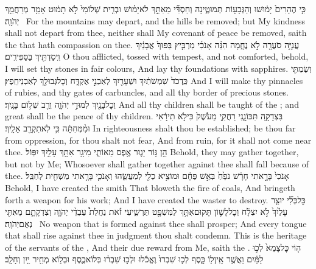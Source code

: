 {כִּ֤י הֶהָרִים֙ יָמ֔וּשׁוּ וְהַגְּבָע֖וֹת תְּמוּטֶ֑ינָה וְחַסְדִּ֞י מֵאִתֵּ֣ךְ לֹא\maqqaf יָמ֗וּשׁ וּבְרִ֤ית שְׁלוֹמִי֙ לֹ֣א תָמ֔וּט אָמַ֥ר מְרַחֲמֵ֖ךְ יְהֹוָֽה׃ \setuma }
{For the mountains may depart, and the hills be removed; but My kindness shall not depart from thee, neither shall My covenant of peace be removed, saith the \lord\space that hath compassion on thee.}
{עֲנִיָּ֥ה סֹעֲרָ֖ה לֹ֣א נֻחָ֑מָה הִנֵּ֨ה אָנֹכִ֜י מַרְבִּ֤יץ בַּפּוּךְ֙ אֲבָנַ֔יִךְ וִֽיסַדְתִּ֖יךְ בַּסַּפִּירִֽים׃}
{O thou afflicted, tossed with tempest, and not comforted, behold, I will set thy stones in fair colours, And lay thy foundations with sapphires.}
{וְשַׂמְתִּ֤י כַּֽדְכֹד֙ שִׁמְשֹׁתַ֔יִךְ וּשְׁעָרַ֖יִךְ לְאַבְנֵ֣י אֶקְדָּ֑ח וְכׇל\maqqaf גְּבוּלֵ֖ךְ לְאַבְנֵי\maqqaf חֵֽפֶץ׃}
{And I will make thy pinnacles of rubies, and thy gates of carbuncles, and all thy border of precious stones.}
{וְכׇל\maqqaf בָּנַ֖יִךְ לִמּוּדֵ֣י יְהֹוָ֑ה וְרַ֖ב שְׁל֥וֹם בָּנָֽיִךְ׃}
{And all thy children shall be taught of the \lord; and great shall be the peace of thy children.}
{בִּצְדָקָ֖ה תִּכּוֹנָ֑נִי רַחֲקִ֤י מֵעֹ֙שֶׁק֙ כִּי\maqqaf לֹ֣א תִירָ֔אִי וּמִ֨מְּחִתָּ֔ה כִּ֥י לֹֽא\maqqaf תִקְרַ֖ב אֵלָֽיִךְ׃}
{In righteousness shalt thou be established; be thou far from oppression, for thou shalt not fear, And from ruin, for it shall not come near thee.}
{הֵ֣ן גּ֥וֹר יָג֛וּר אֶ֖פֶס מֵאוֹתִ֑י מִי\maqqaf גָ֥ר אִתָּ֖ךְ עָלַ֥יִךְ יִפּֽוֹל׃}
{Behold, they may gather together, but not by Me; Whosoever shall gather together against thee shall fall because of thee.}
{ אָנֹכִי֙ בָּרָ֣אתִי חָרָ֔שׁ נֹפֵ֙חַ֙ בְּאֵ֣שׁ פֶּחָ֔ם וּמוֹצִ֥יא כְלִ֖י לְמַעֲשֵׂ֑הוּ וְאָנֹכִ֛י בָּרָ֥אתִי מַשְׁחִ֖ית לְחַבֵּֽל׃}
{Behold, I have created the smith That bloweth the fire of coals, And bringeth forth a weapon for his work; And I have created the waster to destroy.}
{כׇּל\maqqaf כְּלִ֞י יוּצַ֤ר עָלַ֙יִךְ֙ לֹ֣א יִצְלָ֔ח וְכׇל\maqqaf לָשׁ֛וֹן תָּקוּם\maqqaf אִתָּ֥ךְ לַמִּשְׁפָּ֖ט תַּרְשִׁ֑יעִי זֹ֡את נַחֲלַת֩ עַבְדֵ֨י יְהֹוָ֧ה וְצִדְקָתָ֛ם מֵאִתִּ֖י נְאֻם\maqqaf יְהֹוָֽה׃ \setuma }
{No weapon that is formed against thee shall prosper; And every tongue that shall rise against thee in judgment thou shalt condemn. This is the heritage of the servants of the \lord, And their due reward from Me, saith the \lord.}
\newperek
{}
{ה֤וֹי כׇּל\maqqaf צָמֵא֙ לְכ֣וּ לַמַּ֔יִם וַאֲשֶׁ֥ר אֵֽין\maqqaf ל֖וֹ כָּ֑סֶף לְכ֤וּ שִׁבְרוּ֙ וֶאֱכֹ֔לוּ וּלְכ֣וּ שִׁבְר֗וּ בְּלוֹא\maqqaf כֶ֛סֶף וּבְל֥וֹא מְחִ֖יר יַ֥יִן וְחָלָֽב׃}
